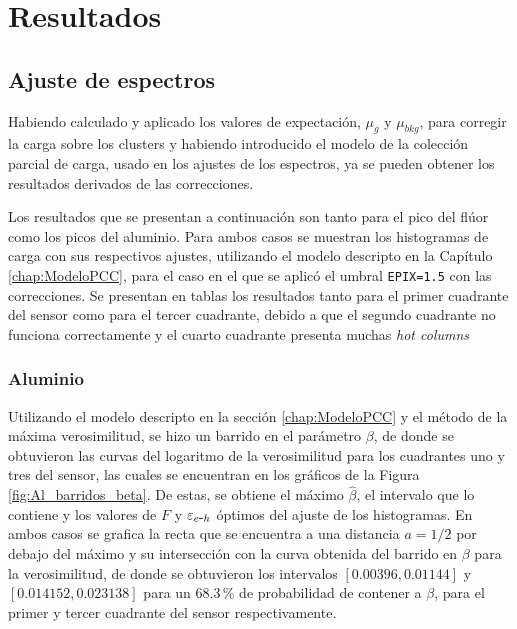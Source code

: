 \chapter{Resultados \label{chap:Resultados}}
\section{Ajuste de espectros}
\noindent Habiendo calculado y aplicado los valores de expectación, $\mu_{g}$ y $\mu_{bkg}$, para corregir la carga sobre los clusters y habiendo introducido el modelo de la colección parcial de carga, usado en los ajustes de los espectros, ya se pueden obtener los resultados derivados de las correcciones.

Los resultados que se presentan a continuación son tanto para el pico del flúor como los picos del aluminio. Para ambos casos se muestran los histogramas de carga con sus respectivos ajustes, utilizando el modelo descripto en la Capítulo \ref{chap:ModeloPCC}, para el caso en el que se aplicó el umbral \verb|EPIX=1.5| con las correcciones. Se presentan en tablas los resultados tanto para el primer cuadrante del sensor como para el tercer cuadrante, debido a que el segundo cuadrante no funciona correctamente y el cuarto cuadrante presenta muchas \textit{hot columns}

\subsection{Aluminio}
\noindent Utilizando el modelo descripto en la sección \ref{chap:ModeloPCC} y el método de la máxima verosimilitud, se hizo un barrido en el parámetro $\beta$, de donde se obtuvieron las curvas del logaritmo de la verosimilitud para los cuadrantes uno y tres del sensor, las cuales se encuentran en los gráficos de la Figura \ref{fig:Al_barridos_beta}. De estas, se obtiene el máximo $\hat{\beta}$, el intervalo que lo contiene y los valores de $F$ y $\varepsilon_{e\mbox{-}h}$ óptimos del ajuste de los histogramas. En ambos casos se grafica la recta que se encuentra a una distancia $a=1/2$ por debajo del máximo y su intersección con la curva obtenida del barrido en $\beta$ para la verosimilitud, de donde se obtuvieron los intervalos $[0.00396, 0.01144]$ y $[0.014152, 0.023138]$ para un $68.3\,\%$ de probabilidad de contener a $\beta$, para el primer y tercer cuadrante del sensor respectivamente. 

